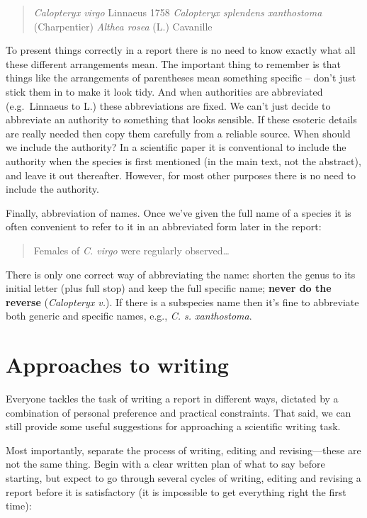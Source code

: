 \documentclass[
]{book}
\begin{document}
\begin{quote}
\emph{Calopteryx virgo} Linnaeus 1758 \emph{Calopteryx splendens xanthostoma} (Charpentier) \emph{Althea rosea} (L.) Cavanille
\end{quote}

To present things correctly in a report there is no need to know exactly what all these different arrangements mean. The important thing to remember is that things like the arrangements of parentheses mean something specific -- don't just stick them in to make it look tidy. And when authorities are abbreviated (e.g.~Linnaeus to L.) these abbreviations are fixed. We can't just decide to abbreviate an authority to something that looks sensible. If these esoteric details are really needed then copy them carefully from a reliable source. When should we include the authority? In a scientific paper it is conventional to include the authority when the species is first mentioned (in the main text, not the abstract), and leave it out thereafter. However, for most other purposes there is no need to include the authority.

Finally, abbreviation of names. Once we've given the full name of a species it is often convenient to refer to it in an abbreviated form later in the report:

\begin{quote}
Females of \emph{C. virgo} were regularly observed\ldots{}
\end{quote}

There is only one correct way of abbreviating the name: shorten the genus to its initial letter (plus full stop) and keep the full specific name; \textbf{never do the reverse} (\emph{Calopteryx v.}). If there is a subspecies name then it's fine to abbreviate both generic and specific names, e.g., \emph{C. s. xanthostoma}.

\hypertarget{approaches-to-writing}{%
\section{Approaches to writing}\label{approaches-to-writing}}

Everyone tackles the task of writing a report in different ways, dictated by a combination of personal preference and practical constraints. That said, we can still provide some useful suggestions for approaching a scientific writing task.

Most importantly, separate the process of writing, editing and revising---these are not the same thing. Begin with a clear written plan of what to say before starting, but expect to go through several cycles of writing, editing and revising a report before it is satisfactory (it is impossible to get everything right the first time):
\end{document}
